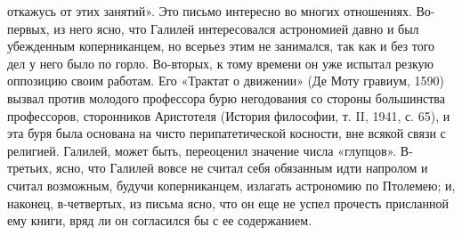 откажусь от этих занятий». Это  письмо интересно во многих отношениях.
Во-первых, из него ясно, что Галилей интересовался астрономией давно и
был убежденным коперниканцем, но всерьез  этим не занимался, так как и
без того дел  у него было по  горло. Во-вторых, к тому  времени он уже
испытал резкую оппозицию  своим работам. Его «Трактат  о движении» (Де
Моту гравиум, 1590) вызвал против молодого профессора бурю негодования
со  стороны большинства  профессоров, сторонников  Аристотеля (История
философии, т.  II, 1941,  с. 65),  и эта буря  была основана  на чисто
перипатетической косности, вне всякой связи с религией. Галилей, может
быть,  переоценил  значение  числа  «глупцов».  В-третьих,  ясно,  что
Галилей  вовсе  не  считал  себя  обязанным  идти  напролом  и  считал
возможным, будучи  коперниканцем, излагать астрономию по  Птолемею; и,
наконец, в-четвертых,  из письма  ясно, что он  еще не  успел прочесть
присланной ему книги, вряд ли он согласился бы с ее содержанием.


